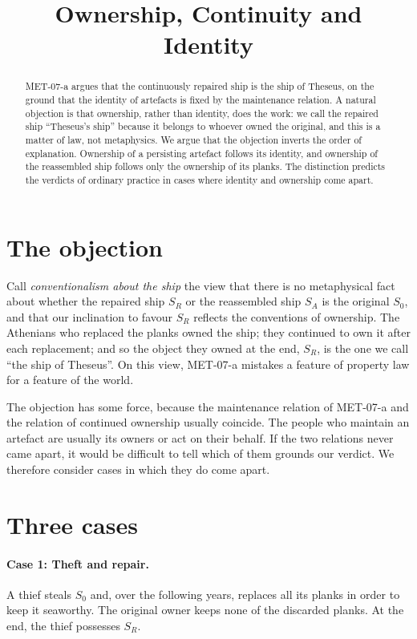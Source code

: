 \documentclass{situationist-preprint}
\title{Ownership, Continuity and Identity}
\begin{document}
\maketitle

\begin{abstract}
MET-07-a argues that the continuously repaired ship is the ship of Theseus, on the ground that the identity of artefacts is fixed by the maintenance relation. A natural objection is that ownership, rather than identity, does the work: we call the repaired ship \enquote{Theseus's ship} because it belongs to whoever owned the original, and this is a matter of law, not metaphysics. We argue that the objection inverts the order of explanation. Ownership of a persisting artefact follows its identity, and ownership of the reassembled ship follows only the ownership of its planks. The distinction predicts the verdicts of ordinary practice in cases where identity and ownership come apart.
\end{abstract}

\section{The objection}

Call \emph{conventionalism about the ship} the view that there is no metaphysical fact about whether the repaired ship $S_R$ or the reassembled ship $S_A$ is the original $S_0$, and that our inclination to favour $S_R$ reflects the conventions of ownership. The Athenians who replaced the planks owned the ship; they continued to own it after each replacement; and so the object they owned at the end, $S_R$, is the one we call \enquote{the ship of Theseus}. On this view, MET-07-a mistakes a feature of property law for a feature of the world.

The objection has some force, because the maintenance relation of MET-07-a and the relation of continued ownership usually coincide. The people who maintain an artefact are usually its owners or act on their behalf. If the two relations never came apart, it would be difficult to tell which of them grounds our verdict. We therefore consider cases in which they do come apart.

\section{Three cases}

\paragraph{Case 1: Theft and repair.} A thief steals $S_0$ and, over the following years, replaces all its planks in order to keep it seaworthy. The original owner keeps none of the discarded planks. At the end, the thief possesses $S_R$.
\end{document}
